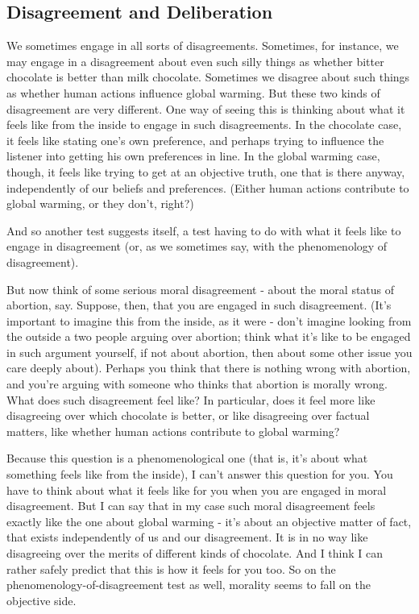 \subsection{Disagreement and Deliberation} 
We sometimes engage in all sorts of disagreements. Sometimes, for instance, we may 
engage in a disagreement about even such silly things as whether bitter chocolate is 
better than milk chocolate. Sometimes we disagree about such things as whether 
human actions influence global warming. But these two kinds of disagreement are very 
different. One way of seeing this is thinking about what it feels like from the inside to 
engage in such disagreements. In the chocolate case, it feels like stating one's own 
preference, and perhaps trying to influence the listener into getting his own preferences 
in line. In the global warming case, though, it feels like trying to get at an objective truth, 
one that is there anyway, independently of our beliefs and preferences. (Either human 
actions contribute to global warming, or they don't, right?) 

And so another test suggests itself, a test having to do with what it feels like to 
engage in disagreement (or, as we sometimes say, with the phenomenology of 
disagreement).  

But now think of some serious moral disagreement - about the moral status of 
abortion, say. Suppose, then, that you are engaged in such disagreement. (It's important 
to imagine this from the inside, as it were - don't imagine looking from the outside a
two people arguing over abortion; think what it's like to be engaged in such argument 
yourself, if not about abortion, then about some other issue you care deeply about). 
Perhaps you think that there is nothing wrong with abortion, and you're arguing with 
someone who thinks that abortion is morally wrong. What does such disagreement feel 
like? In particular, does it feel more like disagreeing over which chocolate is better, or 
like disagreeing over factual matters, like whether human actions contribute to global 
warming?  

Because this question is a phenomenological one (that is, it's about what 
something feels like from the inside), I can't answer this question for you. You have to 
think about what it feels like for you when you are engaged in moral disagreement. But I 
can say that in my case such moral disagreement feels exactly like the one about global 
warming - it's about an objective matter of fact, that exists independently of us and our 
disagreement. It is in no way like disagreeing over the merits of different kinds of 
chocolate. And I think I can rather safely predict that this is how it feels for you too.  
So on the phenomenology-of-disagreement test as well, morality seems to fall on the 
objective side.  

